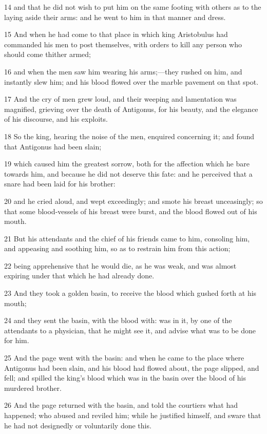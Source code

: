 14 and that he did not wish to put him on the same footing with others as to the laying aside their arms: and he went to him in that manner and dress. 

15 And when he had come to that place in which king Aristobulus had commanded his men to post themselves, with orders to kill any person who should come thither armed; 

16 and when the men saw him wearing his arms;—they rushed on him, and instantly slew him; and his blood flowed over the marble pavement on that spot. 

17 And the cry of men grew loud, and their weeping and lamentation was magnified, grieving over the death of Antigonus, for his beauty, and the elegance of his discourse, and his exploits. 

18 So the king, hearing the noise of the men, enquired concerning it; and found that Antigonus had been slain; 

19 which caused him the greatest sorrow, both for the affection which he bare towards him, and because he did not deserve this fate: and he perceived that a snare had been laid for his brother: 

20 and he cried aloud, and wept exceedingly; and smote his breast unceasingly; so that some blood-vessels of his breast were burst, and the blood flowed out of his mouth. 

21 But his attendants and the chief of his friends came to him, consoling him, and appeasing and soothing him, so as to restrain him from this action; 

22 being apprehensive that he would die, as he was weak, and was almost expiring under that which he had already done. 

23 And they took a golden basin, to receive the blood which gushed forth at his mouth; 

24 and they sent the basin, with the blood with: was in it, by one of the attendants to a physician, that he might see it, and advise what was to be done for him. 

25 And the page went with the basin: and when he came to the place where Antigonus had been slain, and his blood had flowed about, the page slipped, and fell; and spilled the king’s blood which was in the basin over the blood of his murdered brother. 

26 And the page returned with the basin, and told the courtiers what had happened; who abused and reviled him; while he justified himself, and sware that he had not designedly or voluntarily done this. 

